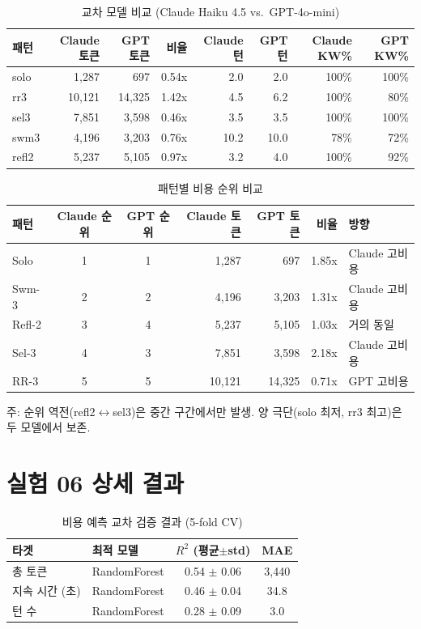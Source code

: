 \documentclass[a4paper,11pt]{article}
\begin{document}
\begin{table}[H]
\centering
\caption{교차 모델 비교 (Claude Haiku 4.5 vs.\ GPT-4o-mini)}
\label{tab:cross-model-tokens}
{\small
\begin{tabular}{lrrrrrrr}
\toprule
패턴 & Claude 토큰 & GPT 토큰 & 비율 & Claude 턴 & GPT 턴 & Claude KW\% & GPT KW\% \\
\midrule
solo  & 1,287  & 697    & 0.54x & 2.0  & 2.0  & 100\% & 100\% \\
rr3   & 10,121 & 14,325 & 1.42x & 4.5  & 6.2  & 100\% & 80\% \\
sel3  & 7,851  & 3,598  & 0.46x & 3.5  & 3.5  & 100\% & 100\% \\
swm3  & 4,196  & 3,203  & 0.76x & 10.2 & 10.0 & 78\%  & 72\% \\
refl2 & 5,237  & 5,105  & 0.97x & 3.2  & 4.0  & 100\% & 92\% \\
\bottomrule
\end{tabular}
}
\end{table}

\begin{table}[H]
\centering
\caption{패턴별 비용 순위 비교}
\label{tab:cross-model-rank}
{\small
\begin{tabular}{lccrrrl}
\toprule
패턴 & Claude 순위 & GPT 순위 & Claude 토큰 & GPT 토큰 & 비율 & 방향 \\
\midrule
Solo  & 1 & 1 & 1,287  & 697    & 1.85x & Claude 고비용 \\
Swm-3 & 2 & 2 & 4,196  & 3,203  & 1.31x & Claude 고비용 \\
Refl-2 & 3 & 4 & 5,237 & 5,105  & 1.03x & 거의 동일 \\
Sel-3 & 4 & 3 & 7,851  & 3,598  & 2.18x & Claude 고비용 \\
RR-3  & 5 & 5 & 10,121 & 14,325 & 0.71x & GPT 고비용 \\
\bottomrule
\end{tabular}
}

\smallskip
{\footnotesize 주: 순위 역전(refl2$\leftrightarrow$sel3)은 중간 구간에서만 발생. 양 극단(solo 최저, rr3 최고)은 두 모델에서 보존.}
\end{table}

\section{실험 06 상세 결과}
\label{app:exp06-details}

\begin{table}[H]
\centering
\caption{비용 예측 교차 검증 결과 (5-fold CV)}
\label{tab:cost-prediction-cv}
{\small
\begin{tabular}{llcc}
\toprule
타겟 & 최적 모델 & $R^{2}$ (평균$\pm$std) & MAE \\
\midrule
총 토큰     & RandomForest & 0.54 $\pm$ 0.06 & 3,440 \\
지속 시간 (초) & RandomForest & 0.46 $\pm$ 0.04 & 34.8 \\
턴 수       & RandomForest & 0.28 $\pm$ 0.09 & 3.0 \\
\bottomrule
\end{tabular}
}
\end{table}
\end{document}
